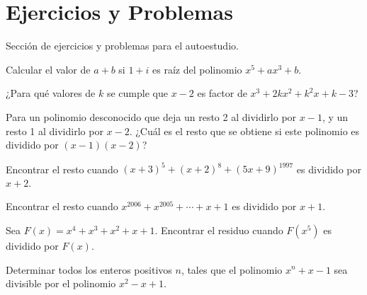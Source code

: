 \section{Ejercicios y Problemas}
{
    Sección de ejercicios y problemas para el autoestudio.

    \begin{section-problem}
        Calcular el valor de $a + b$ si $1 + i$ es raíz del polinomio $x^5 + ax^3 + b$.
    \end{section-problem}

    \begin{section-problem}
        ¿Para qué valores de $k$ se cumple que $x - 2$ es factor de $x^3 + 2kx^2 + k^2 x + k - 3$?
    \end{section-problem}

    \begin{section-problem}
        Para un polinomio desconocido que deja un resto 2 al dividirlo por $x - 1$, y un resto 1 al dividirlo por $x - 2$.
        ¿Cuál es el resto que se obtiene si este polinomio es dividido por $(x - 1)(x - 2)$?
    \end{section-problem}

    \begin{section-problem}
        Encontrar el resto cuando $(x + 3)^5 + (x + 2)^8 + (5x + 9)^{1997}$ es dividido por $x + 2$.
    \end{section-problem}

    \begin{section-problem}
        Encontrar el resto cuando $x^{2006} + x^{2005} + \cdots + x + 1$ es dividido por $x + 1$.
    \end{section-problem}

    \begin{section-problem}
        Sea $F(x) = x^4 + x^3 + x^2 + x + 1$. Encontrar el residuo cuando $F(x^5)$ es dividido por $F(x)$.
    \end{section-problem}

    \begin{section-problem}
        Determinar todos los enteros positivos $n$, tales que el polinomio $x^n + x - 1$ sea divisible por el polinomio $x^2 - x + 1$.
    \end{section-problem}
}